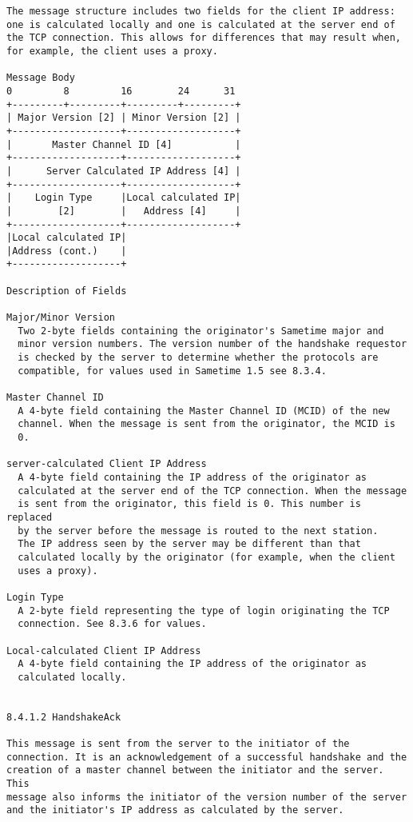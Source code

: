 \documentclass[titlepage,oneside]{book}
\begin{document}
\begin{verbatim}
The message structure includes two fields for the client IP address:
one is calculated locally and one is calculated at the server end of
the TCP connection. This allows for differences that may result when,
for example, the client uses a proxy.

Message Body
0         8         16        24      31
+---------+---------+---------+---------+
| Major Version [2] | Minor Version [2] |
+-------------------+-------------------+
|       Master Channel ID [4]           |
+-------------------+-------------------+
|      Server Calculated IP Address [4] |
+-------------------+-------------------+
|    Login Type     |Local calculated IP|
|        [2]        |   Address [4]     |
+-------------------+-------------------+
|Local calculated IP|
|Address (cont.)    |
+-------------------+

Description of Fields

Major/Minor Version
  Two 2-byte fields containing the originator's Sametime major and
  minor version numbers. The version number of the handshake requestor
  is checked by the server to determine whether the protocols are
  compatible, for values used in Sametime 1.5 see 8.3.4.

Master Channel ID
  A 4-byte field containing the Master Channel ID (MCID) of the new
  channel. When the message is sent from the originator, the MCID is
  0.

server-calculated Client IP Address
  A 4-byte field containing the IP address of the originator as
  calculated at the server end of the TCP connection. When the message
  is sent from the originator, this field is 0. This number is replaced
  by the server before the message is routed to the next station.
  The IP address seen by the server may be different than that
  calculated locally by the originator (for example, when the client
  uses a proxy).

Login Type
  A 2-byte field representing the type of login originating the TCP
  connection. See 8.3.6 for values.

Local-calculated Client IP Address
  A 4-byte field containing the IP address of the originator as
  calculated locally.


8.4.1.2 HandshakeAck

This message is sent from the server to the initiator of the
connection. It is an acknowledgement of a successful handshake and the
creation of a master channel between the initiator and the server. This
message also informs the initiator of the version number of the server
and the initiator's IP address as calculated by the server.


\end{verbatim}
\end{document}
